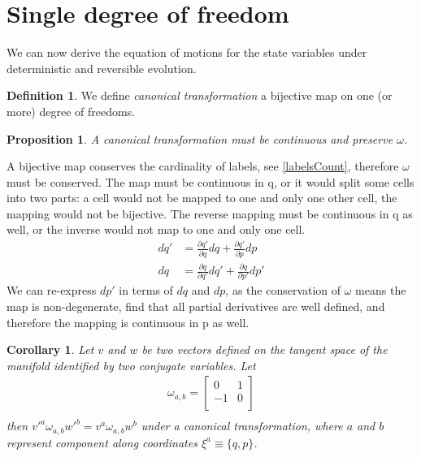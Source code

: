 \documentclass[aps,pra,10pt,twocolumn,floatfix,nofootinbib]{revtex4-1}
\newtheorem{cor}[thm]{Corollary}
\newtheorem{prop}[thm]{Proposition}
\theoremstyle{definition}
\newtheorem{defn}[thm]{Definition}
\begin{document}
\section{Single degree of freedom}

We can now derive the equation of motions for the state variables under deterministic and reversible evolution.

\begin{defn}\label{canonical}
We define \emph{canonical transformation} a bijective map on one (or more) degree of freedoms.
\end{defn}

\begin{prop}\label{continuousMapping}
A canonical transformation must be continuous and preserve $\omega$.
\end{prop}

A bijective map conserves the cardinality of labels, see \ref{labelsCount}, therefore $\omega$ must be conserved. The map must be continuous in q, or it would split some cells into two parts: a cell would not be mapped to one and only one other cell, the mapping would not be bijective. The reverse mapping must be continuous in q as well, or the inverse would not map to one and only one cell.
\begin{align*}
dq' &= \frac{\partial q'}{\partial q} dq + \frac{\partial q'}{\partial p} dp \\
dq &= \frac{\partial q}{\partial q'} dq' + \frac{\partial q}{\partial p'} dp'
\end{align*}
We can re-express $dp'$ in terms of $dq$ and $dp$, as the conservation of $\omega$ means the map is non-degenerate, find that all partial derivatives are well defined, and therefore the mapping is continuous in p as well.

\begin{cor}\label{sdofInvariant}
Let $v$ and $w$ be two vectors defined on the tangent space of the manifold identified by two conjugate variables. Let
\begin{align*}
\omega_{a, b} = \left[
  \begin{array}{cc}
    0 & 1 \\
    -1 & 0 \\
  \end{array}
\right] \\
\end{align*}
then $v'^{a} \omega_{a, b} w'^{b}=v^{a} \omega_{a, b} w^{b}$ under a canonical transformation, where $a$ and $b$ represent component along coordinates $\xi^{a} \equiv \{q,p\}$.
\end{cor}
\end{document}
